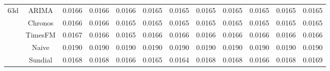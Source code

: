\begin{table}[H]
{\begin{tabular}{cccccccccccc}
\midrule
\multirow[c]{5}{*}{63d} & ARIMA & 0.0166 & 0.0166 & 0.0166 & 0.0165 & 0.0165 & 0.0165 & 0.0165 & 0.0165 & 0.0165 & 0.0165 \\
 & Chronos & 0.0166 & 0.0166 & 0.0165 & 0.0165 & 0.0165 & 0.0165 & 0.0165 & 0.0165 & 0.0165 & 0.0165 \\
 & TimesFM & 0.0167 & 0.0166 & 0.0165 & 0.0166 & 0.0166 & 0.0166 & 0.0166 & 0.0166 & 0.0166 & 0.0166 \\
 & Naive & 0.0190 & 0.0190 & 0.0190 & 0.0190 & 0.0190 & 0.0190 & 0.0190 & 0.0190 & 0.0190 & 0.0190 \\
 & Sundial & 0.0168 & 0.0168 & 0.0166 & 0.0165 & 0.0164 & 0.0168 & 0.0168 & 0.0166 & 0.0168 & 0.0169 \\
\bottomrule
\end{tabular}

 }
\end{table}
